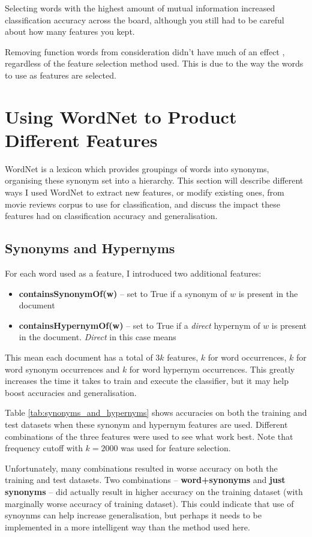 \documentclass{article}
\begin{document}
Selecting words with the highest amount of mutual information increased classification accuracy across the board, although you still had to be careful about how many features you kept.

Removing function words from consideration didn't have much of an effect , regardless of the feature selection method used. This is due to the way the words to use as features are selected.

\section{Using WordNet to Product Different Features}

WordNet is a lexicon which provides groupings of words into synonyms, organising these synonym set into a hierarchy. This section will describe different ways I used WordNet to extract new features, or modify existing ones, from movie reviews corpus to use for classification, and discuss the impact these features had on classification accuracy and generalisation.

\subsection{Synonyms and Hypernyms}

For each word used as a feature, I introduced two additional features:
\begin{itemize}
	\item \textbf{containsSynonymOf(w)} -- set to True if a synonym of $w$ is present in the document
	\item \textbf{containsHypernymOf(w)} -- set to True if a \textit{direct} hypernym of $w$ is present in the document. \textit{Direct} in this case means 
	\end{itemize}
This mean each document has a total of $3k$ features, $k$ for word occurrences, $k$ for word synonym occurrences and $k$ for word hypernym occurrences. This greatly increases the time it takes to train and execute the classifier, but it may help boost accuracies and generalisation.

Table \ref{tab:synonyms_and_hypernyms} shows accuracies on both the training and test datasets when these synonym and hypernym features are used. Different combinations of the three features were used to see what work best. Note that frequency cutoff with $k = 2000$ was used for feature selection.

Unfortunately, many combinations resulted in worse accuracy on both the training and test datasets. Two combinations -- \textbf{word+synonyms} and \textbf{just synonyms} -- did actually result in higher accuracy on the training dataset (with marginally worse accuracy of training dataset).  This could indicate that use of synoynms can help increase generalisation, but perhaps it needs to be implemented in a more intelligent way than the method used here.
\end{document}
